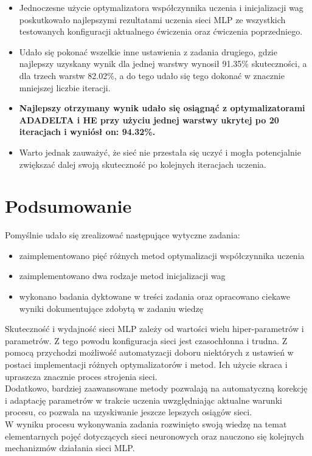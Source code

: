 \documentclass[17pt]{article}
\begin{document}
\begin{enumerate}
\begin{itemize}
\item Jednoczesne użycie optymalizatora współczynnika uczenia i inicjalizacji wag poskutkowało najlepszymi rezultatami uczenia sieci MLP ze wszystkich testowanych konfiguracji aktualnego ćwiczenia oraz ćwiczenia poprzedniego.
\item Udało się pokonać wszelkie inne ustawienia z zadania drugiego, gdzie najlepszy uzyskany wynik dla jednej warstwy wynosił 91.35\% skuteczności, a dla trzech warstw 82.02\%, a do tego udało się tego dokonać w znacznie mniejszej liczbie iteracji.
\item \textbf{Najlepszy otrzymany wynik udało się osiągnąć z optymalizatorami ADADELTA i HE przy użyciu jednej warstwy ukrytej po 20 iteracjach i wyniósł on: 94.32\%.} 
\item Warto jednak zauważyć, że sieć nie przestała się uczyć i mogła potencjalnie zwiększać dalej swoją skuteczność po kolejnych iteracjach uczenia.


\end{itemize}

\end{enumerate}

\newpage

\section{Podsumowanie}
\vspace{4mm}

Pomyślnie udało się zrealizować następujące wytyczne zadania:
\begin{itemize}
\item zaimplementowano pięć różnych metod optymalizacji współczynnika uczenia
\item zaimplementowano dwa rodzaje metod inicjalizacji wag
\item wykonano badania dyktowane w treści zadania oraz opracowano ciekawe wyniki dokumentujące zdobytą w zadaniu wiedzę
\end{itemize}

\vspace{4mm}
Skuteczność i wydajność sieci MLP zależy od wartości wielu hiper-parametrów i parametrów. Z tego powodu konfiguracja sieci jest czasochłonna i trudna. Z pomocą przychodzi możliwość automatyzacji doboru niektórych z ustawień w postaci implementacji różnych optymalizatorów i metod. Ich użycie skraca i upraszcza znacznie proces strojenia sieci.\\

Dodatkowo, bardziej zaawansowane metody pozwalają na automatyczną korekcję i adaptację parametrów w trakcie uczenia uwzględniając aktualne warunki procesu, co pozwala na uzyskiwanie jeszcze lepszych osiągów sieci.\\

W wyniku procesu wykonywania zadania rozwinięto swoją wiedzę na temat elementarnych pojęć dotyczących sieci neuronowych oraz nauczono się kolejnych mechanizmów działania sieci MLP.\\
\end{document}
